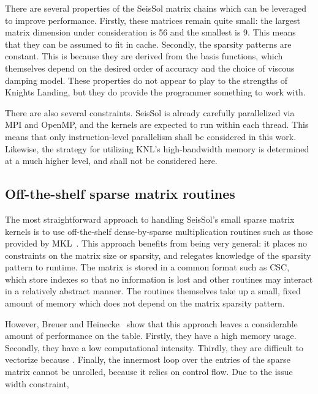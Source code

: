     There are several properties of the SeisSol matrix chains which can be leveraged to improve performance. Firstly, these matrices remain quite small: the largest matrix dimension under consideration is 56 and the smallest is 9. This means that they can be assumed to fit in cache. Secondly, the sparsity patterns are constant. This is because they are derived from the basis functions, which themselves depend on the desired order of accuracy and the choice of viscous damping model. These properties do not appear to play to the strengths of Knights Landing, but they do provide the programmer something to work with.

    There are also several constraints. SeisSol is already carefully parallelized via MPI and OpenMP, and the kernels are expected to run within each thread. This means that only instruction-level parallelism shall be considered in this work. Likewise, the strategy for utilizing KNL's high-bandwidth memory is determined at a much higher level, and shall not be considered here.

\subsection{Off-the-shelf sparse matrix routines}

      The most straightforward approach to handling SeisSol's small sparse matrix kernels is to use off-the-shelf dense-by-sparse multiplication routines such as those provided by MKL~\cite{IntelCSCMM}. This approach benefits from being very general: it places no constraints on the matrix size or sparsity, and relegates knowledge of the sparsity pattern to runtime. The matrix is stored in a common format such as CSC, which store indexes so that no information is lost and other routines may interact in a relatively abstract manner. The routines themselves take up a small, fixed amount of memory which does not depend on the matrix sparsity pattern.

      However, Breuer and Heinecke~\cite{breuer} show that this approach leaves a considerable amount of performance on the table. Firstly, they have a high memory usage. Secondly, they have a low computational intensity. Thirdly, they are difficult to vectorize because . Finally, the innermost loop over the entries of the sparse matrix cannot be unrolled, because it relies on control flow. Due to the issue width constraint, 

